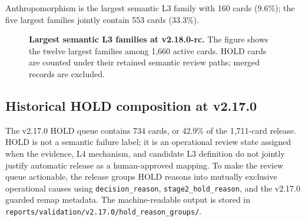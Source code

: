 \documentclass[11pt,a4paper]{article}
\newcommand{\code}[1]{\texttt{#1}}
\begin{document}
Anthropomorphism is the largest semantic L3 family with 160 cards (9.6\%);
the five largest families jointly contain 553 cards (33.3\%).

\begin{figure}[H]
\centering
{}
\caption{\textbf{Largest semantic L3 families at v2.18.0-rc.} The figure
shows the twelve largest families among 1,660 active cards. HOLD cards are
counted under their retained semantic review paths; merged records are
excluded.}
\label{fig:l3}
\end{figure}

\subsection{Historical HOLD composition at v2.17.0}

The v2.17.0 HOLD queue contains 734 cards, or 42.9\% of the 1,711-card
release. HOLD is not a semantic failure label; it is an operational review
state assigned when the evidence, L4 mechanism, and candidate L3 definition do
not jointly justify automatic release as a human-approved mapping. To make the
review queue actionable, the release groups HOLD reasons into mutually
exclusive operational causes using \code{decision\_reason},
\code{stage2\_hold\_reason}, and the v2.17.0 guarded remap metadata. The
machine-readable output is stored in
\code{reports/validation/v2.17.0/hold\_reason\_groups/}.
\end{document}
